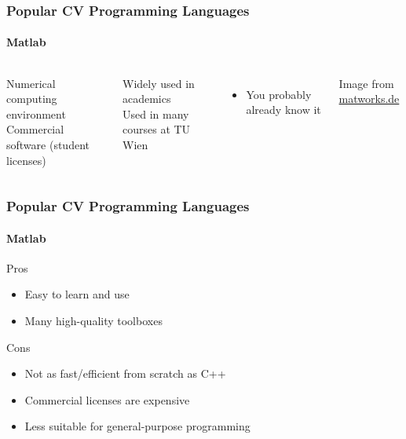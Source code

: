 \documentclass[xetex,professionalfont]{beamer}
\begin{document}
\begin{frame}
\frametitle{Popular CV Programming Languages}
\framesubtitle{Matlab}

\begin{columns}

Numerical computing environment \\
Commercial software (student licenses)

\bigskip
Widely used in academics \\
Used in many courses at TU Wien
\begin{itemize}
	\item You probably already know it
\end{itemize}


\begin{center}
{
	{\centering Image from \url{matworks.de}}}
\end{center}

\end{columns}

\end{frame}


\begin{frame}
\frametitle{Popular CV Programming Languages}
\framesubtitle{Matlab}

Pros
\begin{itemize}
	\item Easy to learn and use
	\item Many high-quality toolboxes
\end{itemize}

\bigskip
Cons
\begin{itemize}
	\item Not as fast/efficient from scratch as C++ %
	\item Commercial licenses are expensive
	\item Less suitable for general-purpose programming
\end{itemize}

\end{frame}
\end{document}
